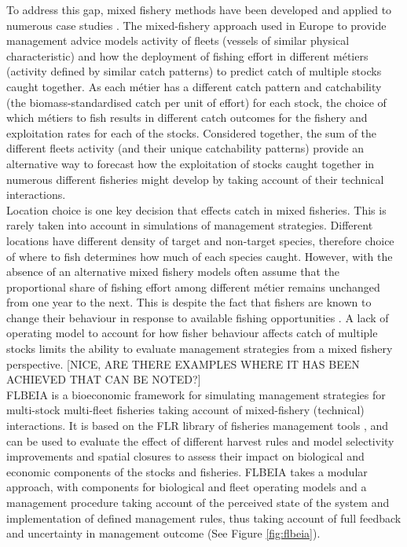 \documentclass[12pt, halfline, a4paper]{ouparticle}
\begin{document}
To address this gap, mixed fishery methods have been developed and
applied to numerous case studies \citep{Ulrich2011, Ulrich2016, Iriondo2012a,
	Garcia2020}. The mixed-fishery approach used in Europe to provide
management advice \citep{ICES2019} models activity of fleets (vessels of
similar physical characteristic) and how the deployment of fishing effort in
different métiers (activity defined by similar catch patterns) to predict catch
of multiple stocks caught together. As each métier has a different catch
pattern and catchability (the biomass-standardised catch per unit of effort)
for each stock, the choice of which métiers to fish results in different catch
outcomes for the fishery and exploitation rates for each of the stocks.
Considered together, the sum of the different fleets activity (and their unique
catchability patterns) provide an alternative way to forecast how the
exploitation of stocks caught together in numerous different fisheries might
develop by taking account of their technical interactions. \\ 

Location choice is one key decision that effects catch in mixed fisheries. This
is rarely taken into account in simulations of management strategies. Different
locations have different density of target and non-target species, therefore
choice of where to fish determines how much of each species caught. However,
with the absence of an alternative mixed fishery models often assume that the
proportional share of fishing effort among different métier remains unchanged from one year
to the next. This is despite the fact that fishers are known to change their
behaviour in response to available fishing opportunities
\citep{VanPutten2012a}. A lack of operating model to account for how fisher
behaviour affects catch of multiple stocks limits the ability to evaluate
management strategies from a mixed fishery perspective. [NICE, ARE THERE EXAMPLES WHERE IT HAS BEEN ACHIEVED THAT CAN BE NOTED?]\\

FLBEIA \citep{Garcia2017} is a bioeconomic framework for simulating management
strategies for multi-stock multi-fleet fisheries taking account of
mixed-fishery (technical) interactions. It is based on the FLR library of
fisheries management tools \citep{Kell2007}, and can be used to evaluate the
effect of different harvest rules and model selectivity improvements and
spatial closures to assess their impact on biological and economic components
of the stocks and fisheries. FLBEIA takes a modular approach, with components
for biological and fleet operating models and a management procedure taking
account of the perceived state of the system and implementation of defined
management rules, thus taking account of full feedback and uncertainty in
management outcome (See Figure \ref{fig:flbeia}). \\
\end{document}
